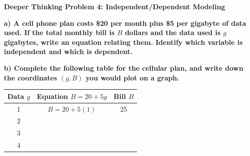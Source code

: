 \documentclass[12pt, letterpaper, fleqn]{article}
\begin{document}
\begin{tcolorbox}[colback=black!5, colframe=black!50, boxrule=1pt, arc=4mm, left=6mm, right=6mm, top=5mm, bottom=5mm]
\textbf{Deeper Thinking Problem 4: Independent/Dependent Modeling}

\medskip

\noindent
\textbf{a) A cell phone plan costs \$20 per month plus \$5 per gigabyte of data used. If the total monthly bill is $B$ dollars and the data used is $g$ gigabytes, write an equation relating them. Identify which variable is independent and which is dependent.}

\vspace{2.5cm}

\noindent
\textbf{b) Complete the following table for the cellular plan, and write down the coordinates $(g, B)$ you would plot on a graph.}
\begin{center}
\begin{tabular}{|c|c|c|}
\hline
Data $g$ & Equation $B = 20 + 5g$ & Bill $B$ \\ \hline
1 & $B = 20 + 5(1)$ & 25 \\ \hline
2 & & \\ \hline
3 & & \\ \hline
4 & & \\ \hline
\end{tabular}
\end{center}

\vspace{1.5cm}
\end{tcolorbox}
\end{document}
